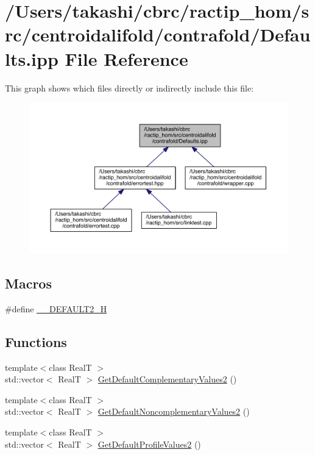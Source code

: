 \hypertarget{centroidalifold_2contrafold_2_defaults_8ipp}{\section{/\+Users/takashi/cbrc/ractip\+\_\+hom/src/centroidalifold/contrafold/\+Defaults.ipp File Reference}
\label{centroidalifold_2contrafold_2_defaults_8ipp}
}
This graph shows which files directly or indirectly include this file\+:
\nopagebreak
\begin{figure}[H]
\begin{center}
\leavevmode
\includegraphics[width=350pt]{centroidalifold_2contrafold_2_defaults_8ipp__dep__incl}
\end{center}
\end{figure}
\subsection*{Macros}
\begin{DoxyCompactItemize}
\item 
\#define \hyperlink{centroidalifold_2contrafold_2_defaults_8ipp_ae1b5e9a8d9505ec78a6bd3aed891729b}{\+\_\+\+\_\+\+D\+E\+F\+A\+U\+L\+T2\+\_\+\+H}
\end{DoxyCompactItemize}
\subsection*{Functions}
\begin{DoxyCompactItemize}
\item 
{\footnotesize template$<$class Real\+T $>$ }\\std\+::vector$<$ Real\+T $>$ \hyperlink{centroidalifold_2contrafold_2_defaults_8ipp_a2c8016e6f9625e1f1c1830029689a09e}{Get\+Default\+Complementary\+Values2} ()
\item 
{\footnotesize template$<$class Real\+T $>$ }\\std\+::vector$<$ Real\+T $>$ \hyperlink{centroidalifold_2contrafold_2_defaults_8ipp_acf310f3f13840d51bad1fa5855487e8e}{Get\+Default\+Noncomplementary\+Values2} ()
\item 
{\footnotesize template$<$class Real\+T $>$ }\\std\+::vector$<$ Real\+T $>$ \hyperlink{centroidalifold_2contrafold_2_defaults_8ipp_a09a7f108111c759a57e2a264a3777300}{Get\+Default\+Profile\+Values2} ()
\end{DoxyCompactItemize}


